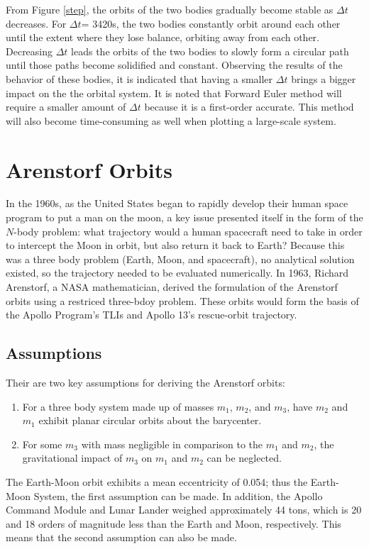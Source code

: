 \documentclass[conf]{new-aiaa}
\begin{document}
     From Figure \ref{step}, the orbits of the two bodies gradually become stable as $\Delta t$ decreases. For $\Delta t$= 3420s, the two bodies constantly orbit around each other until the extent where they lose balance, orbiting away from each other. Decreasing $\Delta t$ leads the orbits of the two bodies to slowly form a circular path until those paths become solidified and constant. Observing the results of the behavior of these bodies, it is indicated that having a smaller $\Delta t$ brings a bigger impact on the the orbital system. It is noted that Forward Euler method will require a smaller amount of $\Delta t$ because it is a first-order accurate. This method will also become time-consuming as well when plotting a large-scale system.
    
\section{Arenstorf Orbits}

In the 1960s, as the United States began to rapidly develop their human space program to put a man on the moon, a key issue presented itself in the form of the $N$-body problem: what trajectory would a human spacecraft need to take in order to intercept the Moon in orbit, but also return it back to Earth? Because this was a three body problem (Earth, Moon, and spacecraft), no analytical solution existed, so the trajectory needed to be evaluated numerically. In 1963, Richard Arenstorf, a NASA mathematician, derived the formulation of the Arenstorf orbits using a restriced three-bdoy problem. These orbits would form the basis of the Apollo Program's TLIs and Apollo 13's rescue-orbit trajectory.
    \subsection{Assumptions}
    Their are two key assumptions for deriving the Arenstorf orbits:
    \begin{enumerate}
        \item For a three body system made up of masses $m_1$, $m_2$, and $m_3$, have $m_2$ and $m_1$ exhibit planar circular orbits about the barycenter.
        \item For some $m_3$ with mass negligible in comparison to the $m_1$ and $m_2$, the gravitational impact of $m_3$ on $m_1$ and $m_2$ can be neglected.
    \end{enumerate}
    The Earth-Moon orbit exhibits a mean eccentricity of 0.054; thus the Earth-Moon System, the first assumption can be made. In addition, the Apollo Command Module and Lunar Lander weighed approximately 44 tons, which is 20 and 18 orders of magnitude less than the Earth and Moon, respectively. This means that the second assumption can also be made.
\end{document}
